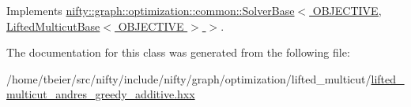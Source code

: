 Implements \hyperlink{classnifty_1_1graph_1_1optimization_1_1common_1_1SolverBase_a1c08eb1ff2b3cca5366c3aab161ba040}{nifty\+::graph\+::optimization\+::common\+::\+Solver\+Base$<$ O\+B\+J\+E\+C\+T\+I\+V\+E, Lifted\+Multicut\+Base$<$ O\+B\+J\+E\+C\+T\+I\+V\+E $>$ $>$}.



The documentation for this class was generated from the following file\+:\begin{DoxyCompactItemize}
\item 
/home/tbeier/src/nifty/include/nifty/graph/optimization/lifted\+\_\+multicut/\hyperlink{lifted__multicut__andres__greedy__additive_8hxx}{lifted\+\_\+multicut\+\_\+andres\+\_\+greedy\+\_\+additive.\+hxx}\end{DoxyCompactItemize}
